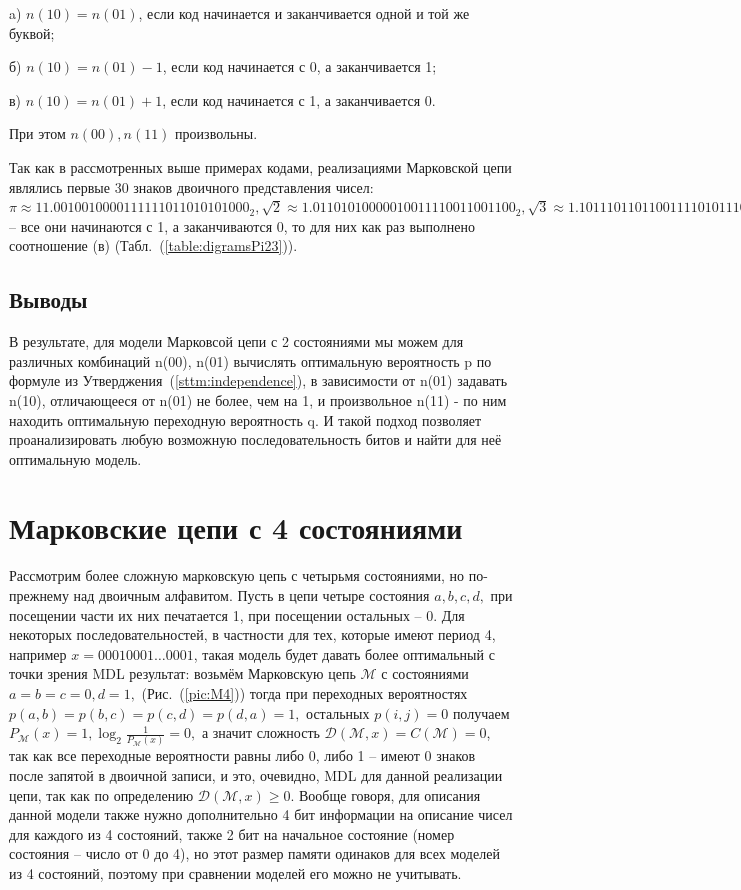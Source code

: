 \documentclass[12pt]{article}
\begin{document}
	a) $n(10)=n(01)$, если код начинается и заканчивается одной и той же буквой;
	
	б) $n(10)=n(01)-1$, если код начинается с 0, а заканчивается 1;
	
	в) $n(10)=n(01)+1$, если код начинается с 1, а заканчивается 0.
	
	При этом $n(00),n(11)$ произвольны.
	
	Так как в рассмотренных выше примерах кодами, реализациями Марковской цепи являлись первые 30 знаков двоичного представления чисел: $\pi\approx11.0010010000111111011010101000_2, \sqrt{2}\approx1.01101010000010011110011001100_2,\sqrt{3}\approx1.10111011011001111010111010000$ -- все они начинаются с 1, а заканчиваются 0, то для них как раз выполнено соотношение (в) (Табл.~(\ref{table:digramsPi23})). 
	
	\subsection*{Выводы}
	В результате, для модели Марковсой цепи с 2 состояниями мы можем для различных комбинаций n(00), n(01) вычислять оптимальную вероятность p по формуле из Утверджения~(\ref{sttm:independence}), в зависимости от n(01) задавать n(10), отличающееся от n(01) не более, чем на 1, и произвольное n(11) - по ним находить оптимальную переходную вероятность q. И такой подход позволяет проанализировать любую возможную последовательность битов и найти для неё оптимальную модель.

	\section{Марковские цепи с 4 состояниями}\label{chapter: M4states}
	Рассмотрим более сложную марковскую цепь с четырьмя состояниями, но по-прежнему над двоичным алфавитом. Пусть в цепи четыре состояния $a,b,c,d,$ при посещении части их них печатается 1, при посещении остальных -- 0. Для некоторых последовательностей, в частности для тех, которые имеют период 4, например $x=00010001\dots0001$, такая модель будет давать более оптимальный с точки зрения MDL результат: возьмём Марковскую цепь $\mathcal{M}$ с состояниями $a=b=c=0,d=1,$ (Рис.~(\ref{pic:M4})) тогда при переходных вероятностях $p(a,b)=p(b,c)=p(c,d)=p(d,a)=1,$ остальных $p(i,j)=0$ получаем $P_{\mathcal{M}}(x)=1,\log_2{\frac{1}{P_{\mathcal{M}}(x)}}=0,$ а значит сложность $\mathcal{D}(\mathcal{M},x)=C(\mathcal{M})=0$, так как все переходные вероятности равны либо 0, либо 1 -- имеют 0 знаков после запятой в двоичной записи, и это, очевидно, MDL для данной реализации цепи, так как по определению $\mathcal{D}(\mathcal{M},x)\ge 0$. Вообще говоря, для описания данной модели также нужно дополнительно 4 бит информации на описание чисел для каждого из 4 состояний, также 2 бит на начальное состояние (номер состояния -- число от 0 до 4), но этот размер памяти одинаков для всех моделей из 4 состояний, поэтому при сравнении моделей его можно не учитывать. 
	
\end{document}
